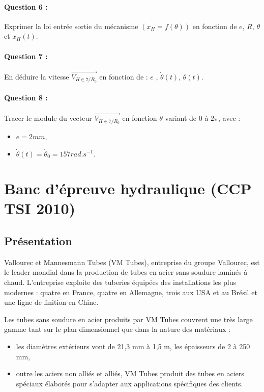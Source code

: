 \paragraph{Question 6 :} Exprimer la loi entrée sortie du mécanisme $(x_H=f(\theta))$ en fonction de $e$, $R$, $\theta$ et $x_H(t)$.

\paragraph{Question 7 :} En déduire la vitesse $\overrightarrow{V_{H\in 7/R_0}}$ en fonction de : $e$ , $\dot{\theta}(t)$, $\theta(t)$.

\paragraph{Question 8 :} Tracer le module du vecteur $\overrightarrow{V_{H\in 7/R_0}}$ en fonction $\theta$ variant de $0$ à $2\pi$, avec :
\begin{itemize}
 \item $e=2mm$,
 \item $\dot{\theta}(t)=\dot{\theta}_0=157rad.s^{-1}$.
\end{itemize}

\newpage

\section{Banc d'épreuve hydraulique (CCP TSI 2010)}

\subsection{Présentation}

Vallourec et Mannesmann Tubes (VM Tubes), entreprise du groupe Vallourec, est le leader mondial dans la production de tubes en acier sans soudure laminés à chaud. L'entreprise exploite des tuberies équipées des installations les plus modernes : quatre en France, quatre en Allemagne, trois aux USA et au
Brésil et une ligne de finition en Chine.

Les tubes sans soudure en acier produits par VM Tubes couvrent une très large gamme tant sur le plan dimensionnel que dans la nature des matériaux :
\begin{itemize}
 \item les diamètres extérieurs vont de 21,3 mm à 1,5 m, les épaisseurs de 2 à 250 mm,
 \item outre les aciers non alliés et alliés, VM Tubes produit des tubes en aciers spéciaux élaborés pour s'adapter aux applications spécifiques des clients.
 \end{itemize}

